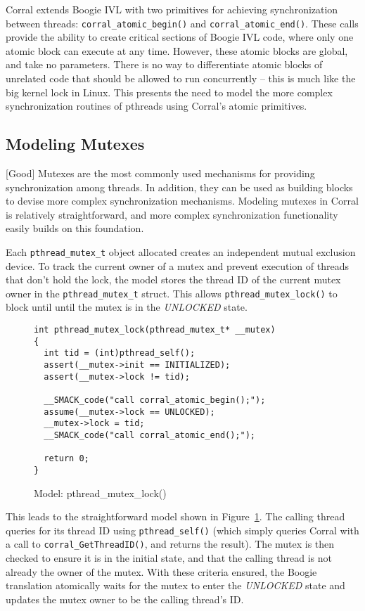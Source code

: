 Corral extends Boogie IVL with two primitives for achieving
synchronization between threads: \lstinline|corral_atomic_begin()| and
\lstinline|corral_atomic_end()|.  These calls provide the ability to
create critical sections of Boogie IVL code, where only one atomic
block can execute at any time.  However, these atomic blocks are
global, and take no parameters.  There is no way to differentiate
atomic blocks of unrelated code that should be allowed to run
concurrently -- this is much like the big kernel lock in Linux.  This
presents the need to model the more complex synchronization routines
of pthreads using Corral's atomic primitives.

\subsection{Modeling Mutexes}
[Good]
Mutexes are the most commonly used mechanisms for providing
synchronization among threads.  In addition, they can be used as
building blocks to devise more complex synchronization mechanisms.
Modeling mutexes in Corral is relatively straightforward, and more
complex synchronization functionality easily builds on this
foundation. 

Each \lstinline|pthread_mutex_t| object allocated creates an
independent mutual exclusion device.  To track the current owner of a
mutex and prevent execution of threads that don't hold the lock, the
model stores the thread ID of the current mutex owner in the
\lstinline|pthread_mutex_t| struct.  This allows
\lstinline|pthread_mutex_lock()| to block until until the mutex is in
the \emph{UNLOCKED} state.


\begin{figure}[h]
\centering
\caption{Model: pthread\_mutex\_lock()}\label{fig:pthread_mutex_lock}
\begin{lstlisting}
int pthread_mutex_lock(pthread_mutex_t* __mutex)
{
  int tid = (int)pthread_self();
  assert(__mutex->init == INITIALIZED);
  assert(__mutex->lock != tid);

  __SMACK_code("call corral_atomic_begin();");
  assume(__mutex->lock == UNLOCKED);
  __mutex->lock = tid;
  __SMACK_code("call corral_atomic_end();");

  return 0;
}
\end{lstlisting}
\end{figure}

This leads to the straightforward model shown in
Figure~\ref{fig:pthread_mutex_lock}. The calling thread queries for
its thread ID using \lstinline|pthread_self()| (which simply queries
Corral with a call to \lstinline|corral_GetThreadID()|, and returns the
result). The mutex is then checked to ensure it is in the initial
state, and that the calling thread is not already the owner of the
mutex.  With these criteria ensured, the Boogie translation atomically
waits for the mutex to enter the \emph{UNLOCKED} state and updates the
mutex owner to be the calling thread's ID.

